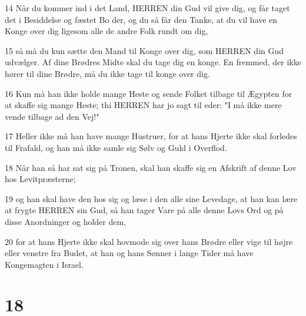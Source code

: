\par 14 Når du kommer ind i det Land, HERREN din Gud vil give dig, og får taget det i Besiddelse og fæstet Bo der, og du så får den Tanke, at du vil have en Konge over dig ligesom alle de andre Folk rundt om dig,
\par 15 så må du kun sætte den Mand til Konge over dig, som HERREN din Gud udvælger. Af dine Brødres Midte skal du tage dig en konge. En fremmed, der ikke hører til dine Brødre, må du ikke tage til konge over dig.
\par 16 Kun må han ikke holde mange Heste og sende Folket tilbage til Ægypten for at skaffe sig mange Heste; thi HERREN har jo sagt til eder: "I må ikke mere vende tilbage ad den Vej!"
\par 17 Heller ikke må han have mange Hustruer, for at hans Hjerte ikke skal forledes til Frafald, og han må ikke samle sig Sølv og Guld i Overflod.
\par 18 Når han så har sat sig på Tronen, skal han skaffe sig en Afskrift af denne Lov hos Levitpræsterne;
\par 19 og han skal have den hos sig og læse i den alle sine Levedage, at han kan lære at frygte HERREN sin Gud, så han tager Vare på alle denne Lovs Ord og på disse Anordninger og holder dem,
\par 20 for at hans Hjerte ikke skal hovmode sig over hans Brødre eller vige til højre eller venstre fra Budet, at han og hans Sønner i lange Tider må have Kongemagten i Israel.

\chapter{18}


